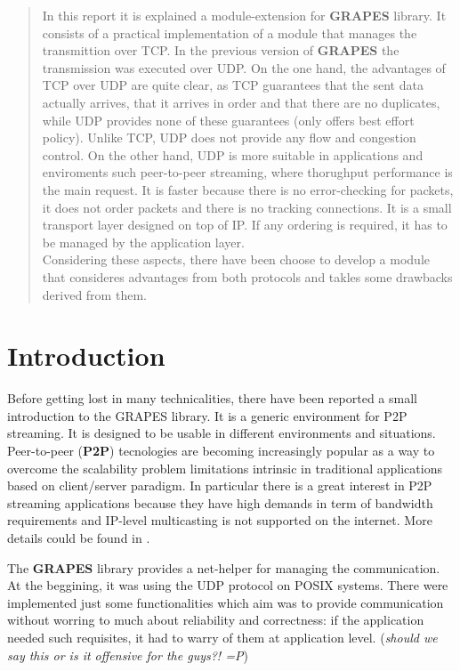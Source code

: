 \documentclass[12pt,a4paper]{report}
\begin{document}


\begin{abstract}
In this report it is explained a module-extension for \textbf{GRAPES} library.
It consists of a practical implementation of a module that manages the
transmittion over TCP. In the previous version of \textbf{GRAPES} the
transmission was
executed over UDP. On the one hand, the advantages of TCP over UDP are quite
clear, as TCP guarantees that the sent data actually arrives, that it arrives
in order and that there are no duplicates, while UDP provides none of these
guarantees (only offers best effort policy). Unlike TCP, UDP does not provide
any flow and congestion control. On the other hand, UDP is more suitable in
applications and enviroments such peer-to-peer streaming, where thorughput
performance is the main request. It is faster because there is no
error-checking for packets, it does not order packets and there is no
tracking connections. It is a small transport layer designed on top of IP.
If any ordering is required, it has to be managed by the application layer.\\
Considering these aspects, there have been choose to develop a module that
consideres advantages from both protocols and takles some drawbacks derived
from them.

\end{abstract}


\chapter{Introduction}
\label{ch:intro}
Before getting lost in many technicalities, there have been reported a small
introduction to the GRAPES library. It is a generic environment for P2P
streaming. It is designed to be usable in different environments and
situations. Peer-to-peer (\textbf{P2P}) tecnologies are becoming increasingly
popular as a way to overcome the scalability problem limitations intrinsic in
traditional applications based on client/server paradigm. In particular there
is a great interest in P2P streaming applications because they have high
demands in term of bandwidth requirements and IP-level multicasting is not
supported on the internet.
More details could be found in \cite{disi10-038}.

The \textbf{GRAPES} library provides a net-helper for managing the
communication. At the beggining, it was using the UDP protocol on POSIX
systems. There were implemented just some functionalities which aim was to
provide communication without worring to much about reliability and
correctness: if the application needed such requisites, it had to warry of
them at application level. (\textit{should we say this or is it offensive for the guys?! =P})
\end{document}
